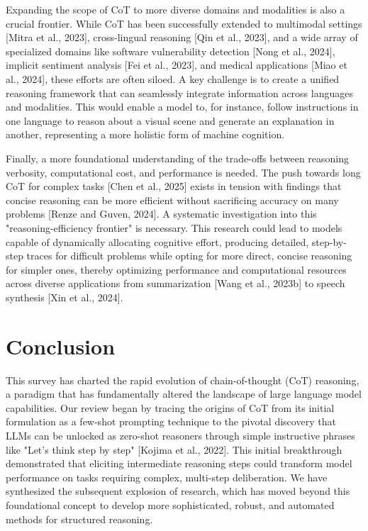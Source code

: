 \documentclass[11pt]{article}
\begin{document}
Expanding the scope of CoT to more diverse domains and modalities is also a crucial frontier. While CoT has been successfully extended to multimodal settings [Mitra et al., 2023], cross-lingual reasoning [Qin et al., 2023], and a wide array of specialized domains like software vulnerability detection [Nong et al., 2024], implicit sentiment analysis [Fei et al., 2023], and medical applications [Miao et al., 2024], these efforts are often siloed. A key challenge is to create a unified reasoning framework that can seamlessly integrate information across languages and modalities. This would enable a model to, for instance, follow instructions in one language to reason about a visual scene and generate an explanation in another, representing a more holistic form of machine cognition.

Finally, a more foundational understanding of the trade-offs between reasoning verbosity, computational cost, and performance is needed. The push towards long CoT for complex tasks [Chen et al., 2025] exists in tension with findings that concise reasoning can be more efficient without sacrificing accuracy on many problems [Renze and Guven, 2024]. A systematic investigation into this "reasoning-efficiency frontier" is necessary. This research could lead to models capable of dynamically allocating cognitive effort, producing detailed, step-by-step traces for difficult problems while opting for more direct, concise reasoning for simpler ones, thereby optimizing performance and computational resources across diverse applications from summarization [Wang et al., 2023b] to speech synthesis [Xin et al., 2024].

\section{Conclusion}
This survey has charted the rapid evolution of chain-of-thought (CoT) reasoning, a paradigm that has fundamentally altered the landscape of large language model capabilities. Our review began by tracing the origins of CoT from its initial formulation as a few-shot prompting technique to the pivotal discovery that LLMs can be unlocked as zero-shot reasoners through simple instructive phrases like "Let's think step by step" [Kojima et al., 2022]. This initial breakthrough demonstrated that eliciting intermediate reasoning steps could transform model performance on tasks requiring complex, multi-step deliberation. We have synthesized the subsequent explosion of research, which has moved beyond this foundational concept to develop more sophisticated, robust, and automated methods for structured reasoning.
\end{document}
